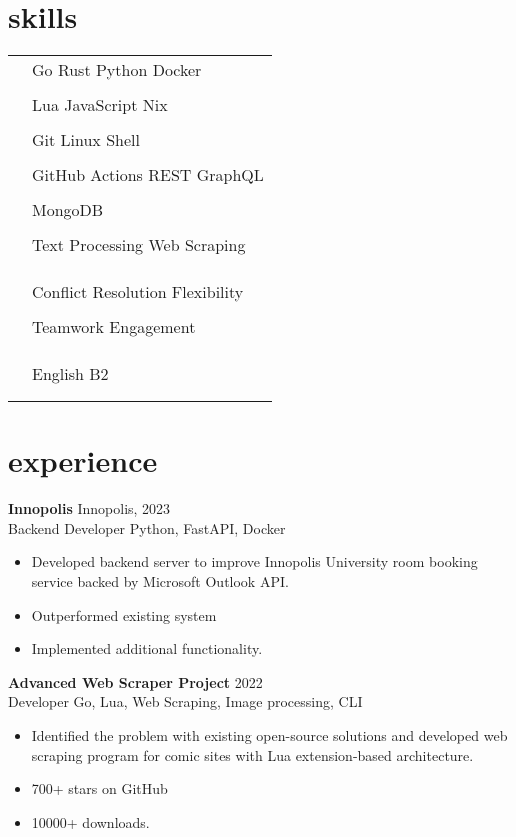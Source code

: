 \documentclass[12pt]{article}
\newcommand{\entry}[4]{{{\textbf{#1}}} \hfill #3 \\ #2 \hfill #4}
\newcommand{\tableentry}[3]{\textsc{#1} & #2\expandafter\ifstrequal\expandafter{#3}{}{\\}{\\[6pt]}}
\begin{document}
\begin{paracol}{2}
\switchcolumn

\section{skills}
\begin{supertabular}{rl}
  \tableentry{\footnotesize\faCode}{Go \textperiodcentered{} Rust \textperiodcentered{} Python \textperiodcentered{} Docker}{}
  \tableentry{}{Lua \textperiodcentered{} JavaScript \textperiodcentered{} Nix}{}
  \tableentry{}{Git \textperiodcentered{} Linux \textperiodcentered{} Shell}{}
  \tableentry{}{GitHub Actions \textperiodcentered{} REST \textperiodcentered{} GraphQL}{}
  \tableentry{}{MongoDB}{}
  \tableentry{}{Text Processing \textperiodcentered{} Web Scraping}{}
  \tableentry{}{}{}

  \tableentry{\footnotesize\faSmileBeam[regular]}{Conflict Resolution \textperiodcentered{} Flexibility}{}
  \tableentry{}{Teamwork \textperiodcentered{} Engagement}{}
  \tableentry{}{}{}

  \tableentry{\footnotesize\faLanguage}{English \textperiodcentered{} B2}{}
\end{supertabular}

\switchcolumn

\section{experience}

\entry{Innopolis}{Backend Developer}{Innopolis, 2023}{Python, FastAPI, Docker}

\begin{flushleft}
    \begin{itemize}[noitemsep,leftmargin=3.5mm,rightmargin=0mm,topsep=6pt]
        \item Developed backend server to improve Innopolis University room booking service backed by Microsoft Outlook API.
        \item Outperformed existing system
        \item Implemented additional functionality.
    \end{itemize}
\end{flushleft}

\medskip

\entry{Advanced Web Scraper Project}{Developer}{2022}{Go, Lua, Web Scraping, Image processing, CLI}

\begin{flushleft}
    \begin{itemize}[noitemsep,leftmargin=3.5mm,rightmargin=0mm,topsep=6pt]
        \item Identified the problem with existing open-source solutions and developed web scraping program for comic sites with Lua extension-based architecture.
        \item 700+ stars on GitHub
        \item 10000+ downloads.
    \end{itemize}
\end{flushleft}


\end{paracol}
\end{document}
